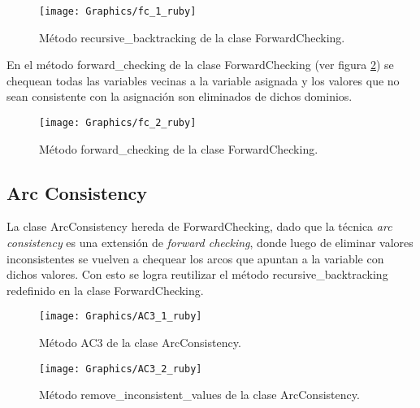 \begin{figure}[h]
	\begin{center}
		\texttt{[image: Graphics/fc\_1\_ruby]}
		\caption{M\'etodo \textsf{recursive\_backtracking} de la clase \textsf{ForwardChecking}.}
		\label{fc_1_ruby}
	\end{center}	
\end{figure}

En el m\'etodo \textsf{forward\_checking} de la clase \textsf{ForwardChecking} (ver figura \ref{fc_2_ruby}) se chequean todas las variables vecinas a la variable asignada y los valores que no sean consistente con la asignaci\'on son eliminados de dichos dominios.

\begin{figure}[h]
	\begin{center}
		\texttt{[image: Graphics/fc\_2\_ruby]}
		\caption{M\'etodo \textsf{forward\_checking} de la clase \textsf{ForwardChecking}.}
		\label{fc_2_ruby}
	\end{center}	
\end{figure}

\subsection{Arc Consistency}

La clase \textsf{ArcConsistency} hereda de \textsf{ForwardChecking}, dado que la t\'ecnica \emph{arc consistency} es una extensi\'on de \emph{forward checking}, donde luego de eliminar valores inconsistentes se vuelven a chequear los arcos que apuntan a la variable con dichos valores. Con esto se logra reutilizar el m\'etodo \textsf{recursive\_backtracking} redefinido en la clase \textsf{ForwardChecking}.

\begin{figure}[h]
	\begin{center}
		\texttt{[image: Graphics/AC3\_1\_ruby]}
		\caption{M\'etodo \textsf{AC3} de la clase \textsf{ArcConsistency}.}
		\label{AC3_1_ruby}
	\end{center}	
\end{figure}

\begin{figure}[h]
	\begin{center}
		\texttt{[image: Graphics/AC3\_2\_ruby]}
		\caption{M\'etodo \textsf{remove\_inconsistent\_values} de la clase \textsf{ArcConsistency}.}
		\label{AC3_2_ruby}
	\end{center}	
\end{figure}

